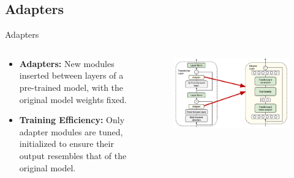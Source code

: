 \documentclass[serif, aspectratio=169]{beamer}
\begin{document}
\subsection{Adapters}
\begin{frame}{Adapters}
    \begin{columns} %

        \begin{column}{0.5\textwidth}
            \begin{itemize}
                \item  
                    \textbf{Adapters: }
                     New modules inserted between layers of a pre-trained model, with the original model weights fixed.
                    \vspace{0.3cm}
                \item  
                    \textbf{Training Efficiency: }
                      Only adapter modules are tuned, initialized to ensure their output resembles that of the original model.
                    \vspace{0.3cm}
            \end{itemize}
        \end{column}

        \begin{column}{0.5\textwidth}
            \begin{figure}
                \centering
                \includegraphics[width=1\textwidth, height=0.85\textheight]{pic/Adaptor.PNG}
            \end{figure}
        \end{column}

    \end{columns}
\end{frame}
\end{document}
